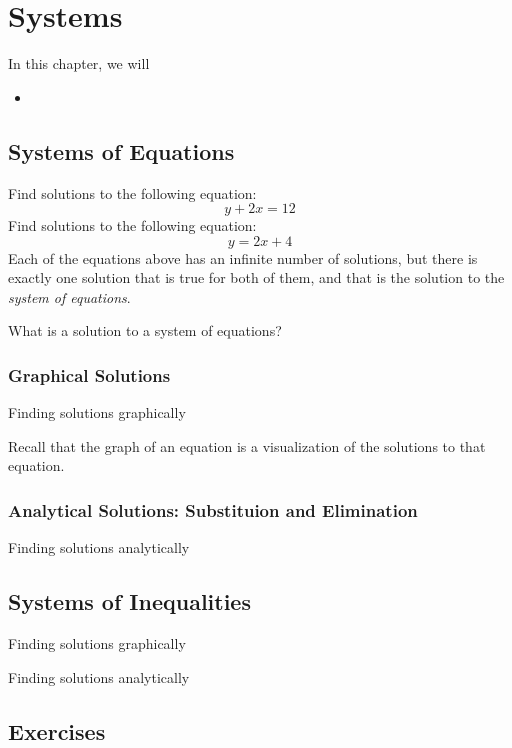
\chapter{Systems}

\begin{summary}
In this chapter, we will 
\begin{itemize}
    \item 
\end{itemize}
\end{summary}


\newpage 
\section{Systems of Equations}


Find solutions to the following equation: 
\[ y+2x=12 \]
Find solutions to the following equation: 
\[ y=2x+4 \]
Each of the equations above has an infinite number of solutions, but there is exactly one solution that is true for both of them, and that is the solution to the \emph{system of equations}.  



What is a solution to a system of equations?

\subsection{Graphical Solutions}
Finding solutions graphically

\begin{remark}
Recall that the graph of an equation is a visualization of the solutions to that equation.  
\end{remark}

\subsection{Analytical Solutions: Substituion and Elimination}
Finding solutions analytically 


\newpage 
\section{Systems of Inequalities}

Finding solutions graphically

Finding solutions analytically 



\newpage 
\section{Exercises} 